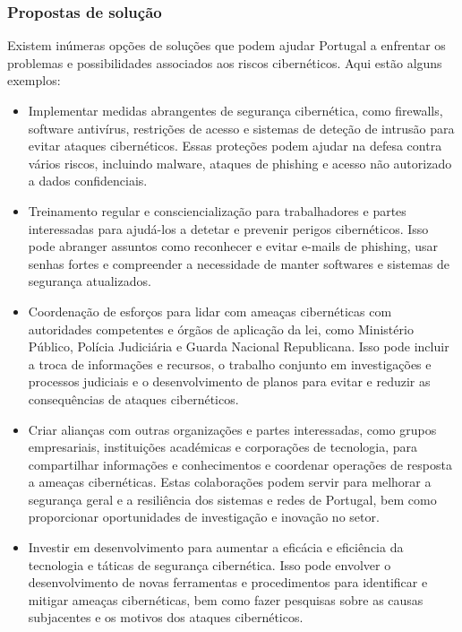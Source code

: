 \subsubsection{Propostas de solução}

Existem inúmeras opções de soluções que podem ajudar Portugal a enfrentar os problemas e possibilidades associados aos riscos cibernéticos. Aqui estão alguns exemplos:

\begin{itemize}
  \item Implementar medidas abrangentes de segurança cibernética, como firewalls, software antivírus, restrições de acesso e sistemas de deteção de intrusão para evitar ataques cibernéticos. Essas proteções podem ajudar na defesa contra vários riscos, incluindo malware, ataques de phishing e acesso não autorizado a dados confidenciais.
  \item Treinamento regular e consciencialização para trabalhadores e partes interessadas para ajudá-los a detetar e prevenir perigos cibernéticos. Isso pode abranger assuntos como reconhecer e evitar e-mails de phishing, usar senhas fortes e compreender a necessidade de manter softwares e sistemas de segurança atualizados.
  \item Coordenação de esforços para lidar com ameaças cibernéticas com autoridades competentes e órgãos de aplicação da lei, como Ministério Público, Polícia Judiciária e Guarda Nacional Republicana. Isso pode incluir a troca de informações e recursos, o trabalho conjunto em investigações e processos judiciais e o desenvolvimento de planos para evitar e reduzir as consequências de ataques cibernéticos.
  \item Criar alianças com outras organizações e partes interessadas, como grupos empresariais, instituições académicas e corporações de tecnologia, para compartilhar informações e conhecimentos e coordenar operações de resposta a ameaças cibernéticas. Estas colaborações podem servir para melhorar a segurança geral e a resiliência dos sistemas e redes de Portugal, bem como proporcionar oportunidades de investigação e inovação no setor.
  \item Investir em desenvolvimento para aumentar a eficácia e eficiência da tecnologia e táticas de segurança cibernética. Isso pode envolver o desenvolvimento de novas ferramentas e procedimentos para identificar e mitigar ameaças cibernéticas, bem como fazer pesquisas sobre as causas subjacentes e os motivos dos ataques cibernéticos.
\end{itemize}
